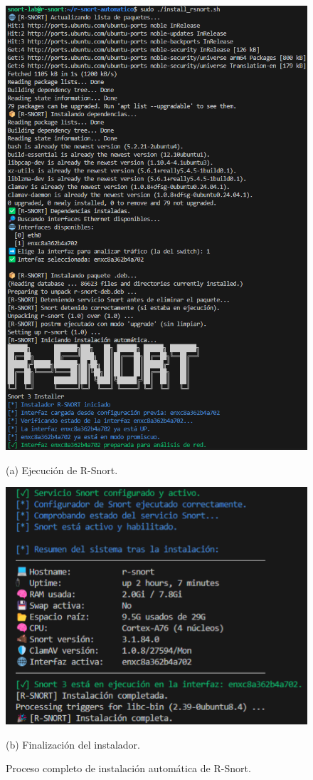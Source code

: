 \documentclass[11pt,a4paper,twoside]{report}
\begin{document}
\begin{figure}[H]
	\centering
	\begin{minipage}[b]{0.48\textwidth}
		\centering
		\includegraphics[scale=0.35]{script_automatico/14.png}
		\caption*{(a) Ejecución de R-Snort.}
	\end{minipage}
	\hfill
	\begin{minipage}[b]{0.48\textwidth}
		\centering
		\includegraphics[scale=0.35]{pruebas_config/10-10.png}
		\caption*{(b) Finalización del instalador.}
	\end{minipage}
	\caption{Proceso completo de instalación automática de R-Snort.}
\end{figure}
\end{document}
